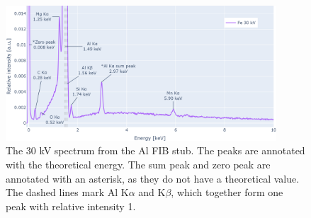 \begin{figure}[h!]
    \centering
    \includegraphics[width=0.90\textwidth]{figures/each_spectra/Al_everything.png}
    \caption{
        The 30 kV spectrum from the Al FIB stub.
        The peaks are annotated with the theoretical energy.
        The sum peak and zero peak are annotated with an asterisk, as they do not have a theoretical value.
        The dashed lines mark Al K$\alpha$ and K$\beta$, which together form one peak with relative intensity 1.
    }
    \label{fig:results:Spectra_Al}
\end{figure}

